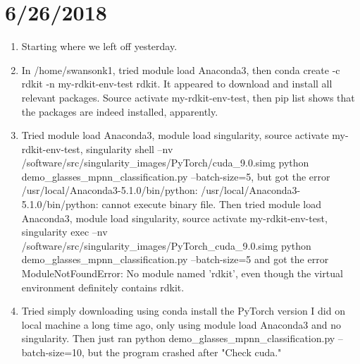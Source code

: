 \documentclass[12pt,reqno]{amsart}
\numberwithin{equation}{section}
\begin{document}
\section{6/26/2018}
\begin{enumerate}
\item Starting where we left off yesterday.  
\item In /home/swansonk1, tried module load Anaconda3, then conda create -c rdkit -n my-rdkit-env-test rdkit.  It appeared to download and install all relevant packages.  Source activate my-rdkit-env-test, then pip list shows that the packages are indeed installed, apparently.  
\item Tried module load Anaconda3, module load singularity, source activate my-rdkit-env-test, singularity shell --nv /software/src/singularity\_images/PyTorch/cuda\_9.0.simg python demo\_glasses\_mpnn\_classification.py --batch-size=5, but got the error /usr/local/Anaconda3-5.1.0/bin/python: /usr/local/Anaconda3-5.1.0/bin/python: cannot execute binary file.  Then tried module load Anaconda3, module load singularity, source activate my-rdkit-env-test, singularity exec --nv /software/src/singularity\_images/PyTorch\_cuda\_9.0.simg python demo\_glasses\_mpnn\_classification.py --batch-size=5 and got the error ModuleNotFoundError: No module named 'rdkit', even though the virtual environment definitely contains rdkit.  
\item Tried simply downloading using conda install the PyTorch version I did on local machine a long time ago, only using module load Anaconda3 and no singularity.  Then just ran python demo\_glasses\_mpnn\_classification.py --batch-size=10, but the program crashed after "Check cuda."  
\end{enumerate}
\end{document}
